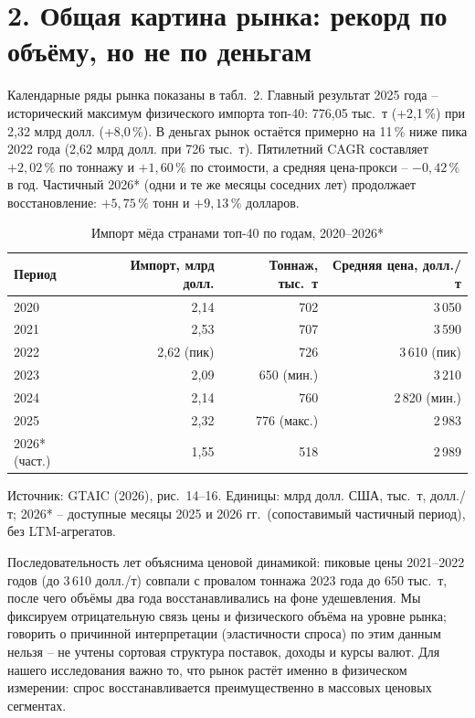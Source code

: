 \documentclass[11pt,a4paper]{article}
\begin{document}
\section*{2. Общая картина рынка: рекорд по объёму, но не по деньгам}

Календарные ряды рынка показаны в табл.~2. Главный результат 2025 года -- исторический максимум
физического импорта топ-40: 776{,}05 тыс.~т (+2{,}1\,\%) при 2{,}32 млрд долл. (+8{,}0\,\%).
В деньгах рынок остаётся примерно на 11\,\% ниже пика 2022 года (2{,}62 млрд долл. при
726 тыс.~т). Пятилетний CAGR составляет $+2{,}02\,\%$ по тоннажу и $+1{,}60\,\%$ по стоимости,
а средняя цена-прокси -- $-0{,}42\,\%$ в год. Частичный 2026* (одни и те же месяцы соседних
лет) продолжает восстановление: $+5{,}75\,\%$ тонн и $+9{,}13\,\%$ долларов.

\begin{table}[h]
\centering
\small
\caption{Импорт мёда странами топ-40 по годам, 2020--2026*}
\begin{tabular}{lrrr}
\toprule
Период & Импорт, млрд долл. & Тоннаж, тыс.~т & Средняя цена, долл./т \\
\midrule
2020 & 2{,}14 & 702 & 3\,050 \\
2021 & 2{,}53 & 707 & 3\,590 \\
2022 & 2{,}62 (пик) & 726 & 3\,610 (пик) \\
2023 & 2{,}09 & 650 (мин.) & 3\,210 \\
2024 & 2{,}14 & 760 & 2\,820 (мин.) \\
2025 & 2{,}32 & 776 (макс.) & 2\,983 \\
2026* (част.) & 1{,}55 & 518 & 2\,989 \\
\bottomrule
\end{tabular}

\noindent Источник: GTAIC (2026), рис.~14--16. Единицы: млрд долл. США, тыс.~т, долл./т;
2026* -- доступные месяцы 2025 и 2026 гг.\ (сопоставимый частичный период), без LTM-агрегатов.
\end{table}

Последовательность лет объяснима ценовой динамикой: пиковые цены 2021--2022 годов
(до 3\,610 долл./т) совпали с провалом тоннажа 2023 года до 650 тыс.~т, после чего объёмы
два года восстанавливались на фоне удешевления. Мы фиксируем отрицательную связь цены
и физического объёма на уровне рынка; говорить о причинной интерпретации (эластичности
спроса) по этим данным нельзя -- не учтены сортовая структура поставок, доходы и курсы валют.
Для нашего исследования важно то, что рынок растёт именно в физическом измерении: спрос
восстанавливается преимущественно в массовых ценовых сегментах.
\end{document}
